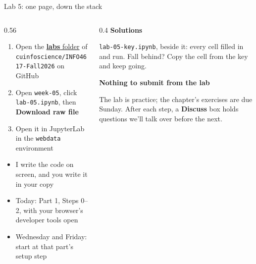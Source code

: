 \documentclass[9pt,aspectratio=169]{beamer}
\begin{document}
\begin{frame}{Lab 5: one page, down the stack}
    \begin{columns}[T]
        \begin{column}{0.56\textwidth}
            \begin{enumerate}\small
                \item Open the \href{https://github.com/cuinfoscience/INFO4617-Fall2026/tree/main/labs}{\textbf{labs} folder} of \texttt{cuinfoscience/INFO4617-Fall2026} on GitHub
                \item Open \texttt{week-05}, click \texttt{lab-05.ipynb}, then \textbf{Download raw file}
                \item Open it in JupyterLab in the \texttt{webdata} environment
            \end{enumerate}

            \medskip
            \begin{itemize}\small
                \item I write the code on screen, and you write it in your copy
                \item Today: Part 1, Steps 0--2, with your browser's developer tools open
                \item Wednesday and Friday: start at that part's setup step
            \end{itemize}
        \end{column}
        \begin{column}{0.4\textwidth}
            \textbf{Solutions}\\[2pt]
            {\footnotesize \texttt{lab-05-key.ipynb}, beside it: every cell filled in and run. Fall behind? Copy the cell from the key and keep going.\par}
            \medskip
            \textbf{Nothing to submit from the lab}\\[2pt]
            {\footnotesize The lab is practice; the chapter's exercises are due Sunday. After each step, a \textbf{Discuss} box holds questions we'll talk over before the next.\par}
        \end{column}
    \end{columns}
\end{frame}
\end{document}
